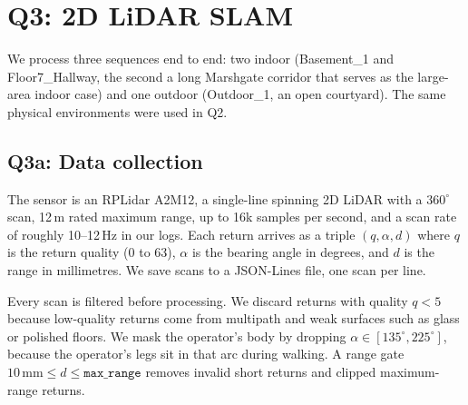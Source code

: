 \documentclass[twocolumn,10pt,a4paper]{article}
\begin{document}
\section{Q3: 2D LiDAR SLAM}
\label{sec:q3}

We process three sequences end to end: two indoor (Basement\_1 and
Floor7\_Hallway, the second a long Marshgate corridor that serves as
the large-area indoor case) and one outdoor (Outdoor\_1, an open
courtyard). The same physical environments were used in Q2.

\subsection{Q3a: Data collection}
\label{sec:q3a}

The sensor is an RPLidar A2M12, a single-line spinning 2D LiDAR with a
$360^{\circ}$ scan, 12\,m rated maximum range, up to 16k samples
per second, and a scan rate of roughly 10--12\,Hz in our logs. Each return arrives as
a triple $(q, \alpha, d)$ where $q$ is the return quality (0 to 63),
$\alpha$ is the bearing angle in degrees, and $d$ is the range in
millimetres. We save scans to a JSON-Lines file, one scan per line.

Every scan is filtered before processing. We discard returns with
quality $q < 5$ because low-quality returns come from multipath and
weak surfaces such as glass or polished floors. We mask the
operator's body by dropping
$\alpha \in [135^{\circ}, 225^{\circ}]$, because the operator's legs
sit in that arc during walking. A range gate
$10\,\text{mm} \le d \le \texttt{max\_range}$ removes invalid short
returns and clipped maximum-range returns.
\end{document}
